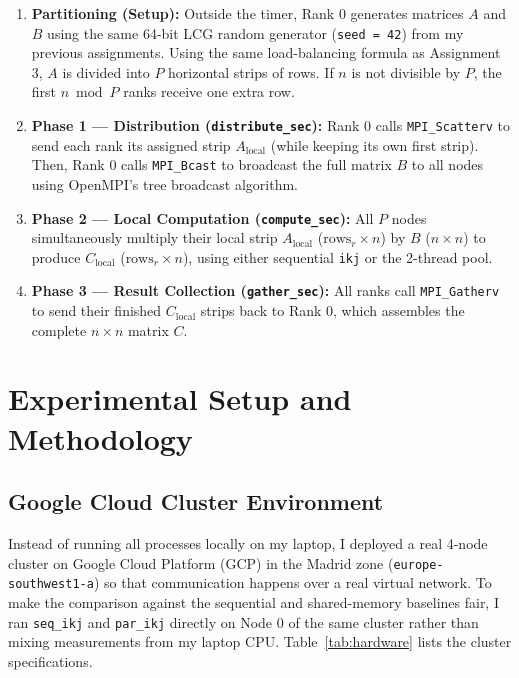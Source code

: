 \documentclass[11pt,a4paper]{article}
\begin{document}
\begin{enumerate}
    \item \textbf{Partitioning (Setup):} Outside the timer, Rank 0 generates matrices $A$ and $B$ using the same 64-bit LCG random generator (\texttt{seed = 42}) from my previous assignments. Using the same load-balancing formula as Assignment 3, $A$ is divided into $P$ horizontal strips of rows. If $n$ is not divisible by $P$, the first $n \bmod P$ ranks receive one extra row.
    \item \textbf{Phase 1 --- Distribution (\texttt{distribute\_sec}):} Rank 0 calls \texttt{MPI\_Scatterv} to send each rank its assigned strip $A_{\text{local}}$ (while keeping its own first strip). Then, Rank 0 calls \texttt{MPI\_Bcast} to broadcast the full matrix $B$ to all nodes using OpenMPI's tree broadcast algorithm.
    \item \textbf{Phase 2 --- Local Computation (\texttt{compute\_sec}):} All $P$ nodes simultaneously multiply their local strip $A_{\text{local}}$ ($\text{rows}_r \times n$) by $B$ ($n \times n$) to produce $C_{\text{local}}$ ($\text{rows}_r \times n$), using either sequential \texttt{ikj} or the 2-thread pool.
    \item \textbf{Phase 3 --- Result Collection (\texttt{gather\_sec}):} All ranks call \texttt{MPI\_Gatherv} to send their finished $C_{\text{local}}$ strips back to Rank 0, which assembles the complete $n \times n$ matrix $C$.
\end{enumerate}

\section{Experimental Setup and Methodology}

\subsection{Google Cloud Cluster Environment}
Instead of running all processes locally on my laptop, I deployed a real 4-node cluster on Google Cloud Platform (GCP) in the Madrid zone (\texttt{europe-southwest1-a}) so that communication happens over a real virtual network. To make the comparison against the sequential and shared-memory baselines fair, I ran \texttt{seq\_ikj} and \texttt{par\_ikj} directly on Node 0 of the same cluster rather than mixing measurements from my laptop CPU. Table~\ref{tab:hardware} lists the cluster specifications.
\end{document}

